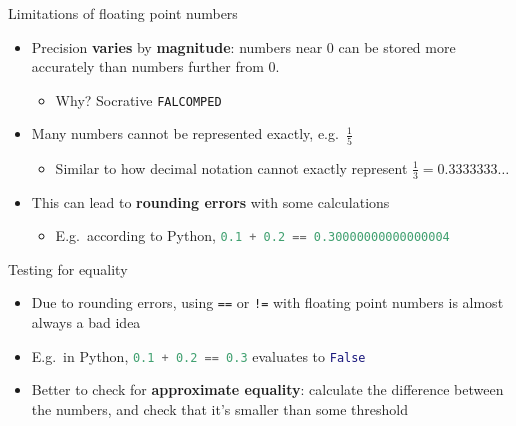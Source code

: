 \begin{frame}{Limitations of floating point numbers}
	\begin{itemize}
		\pause\item Precision \textbf{varies} by \textbf{magnitude}: numbers near 0 can be stored more accurately
			than numbers further from 0.
			\begin{itemize}
				\pause\item Why? Socrative \texttt{FALCOMPED}
			\end{itemize}
		\pause\item Many numbers cannot be represented exactly, e.g.\ $\frac15$
			\begin{itemize}
				\pause\item Similar to how decimal notation cannot exactly represent
					$\frac13 = 0.3333333\dots$
			\end{itemize}
		\pause\item This can lead to \textbf{rounding errors} with some calculations
			\begin{itemize}
				\pause\item E.g.\ according to Python,
					\lstinline[language=Python]{0.1 + 0.2 == 0.30000000000000004}
			\end{itemize}
	\end{itemize}
\end{frame}

\begin{frame}{Testing for equality}
	\begin{itemize}
		\pause\item Due to rounding errors, using \lstinline{==} or \lstinline{!=} with floating point numbers is almost always a bad idea
		\pause\item E.g.\ in Python, \lstinline[language=Python]{0.1 + 0.2 == 0.3} evaluates to \lstinline[language=Python]{False}
		\pause\item Better to check for \textbf{approximate equality}: calculate the difference between the numbers,
			and check that it's smaller than some threshold
	\end{itemize}
\end{frame}
